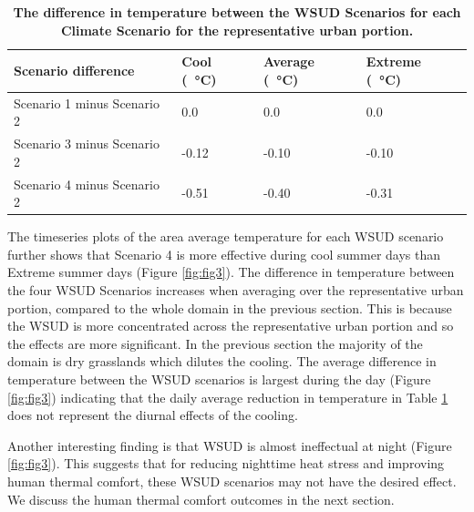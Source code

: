 \documentclass[final,3p,times,authoryear]{elsarticle}
\begin{document}
\begin{table}[!htbp]
\caption{\bf The difference in temperature between the WSUD Scenarios for each Climate Scenario for the representative urban portion. \label{tab:scenarioDiffRep}}     
\begin{tabular}{ l l l l}
\textbf{Scenario difference} & \textbf{Cool (\SI{}{\degreeCelsius})}
& \textbf{Average (\SI{}{\degreeCelsius})}
& \textbf{Extreme (\SI{}{\degreeCelsius})}\\ \hline
Scenario 1 minus Scenario 2 & 0.0  & 0.0 & 0.0\\ 
Scenario 3 minus Scenario 2 & -0.12  & -0.10 & -0.10\\ 
Scenario 4 minus Scenario 2 & -0.51  & -0.40 & -0.31\\ 
\hline
\end{tabular}
\end{table}



The timeseries plots of the area average temperature for each WSUD scenario further shows that Scenario 4 is more effective during cool summer days than Extreme summer days (Figure \ref{fig:fig3}). The difference in temperature between the four WSUD Scenarios increases when averaging over the representative urban portion, compared to the whole domain in the previous section. This is because the WSUD is more concentrated across the representative urban portion and so the effects are more significant. In the previous section the majority of the domain is dry grasslands which dilutes the cooling. The average difference in temperature between the WSUD scenarios is largest during the day (Figure \ref{fig:fig3}) indicating that the daily average reduction in temperature in Table \ref{tab:scenarioDiffRep} does not represent the diurnal effects of the cooling.

Another interesting finding is that WSUD is almost ineffectual at night (Figure \ref{fig:fig3}). This suggests that for reducing nighttime heat stress and improving human thermal comfort, these WSUD scenarios may not have the desired effect. We discuss the human thermal comfort outcomes in the next section.
\end{document}
